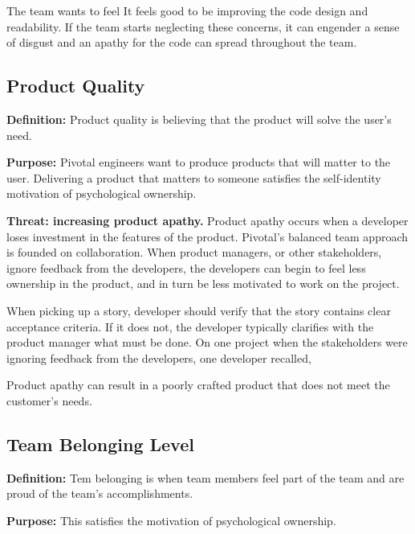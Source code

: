 The team wants to feel   It feels good to be improving the code design and readability. If the team starts neglecting these concerns, it can engender a sense of disgust and an apathy for the code can spread throughout the team.

\subsection{Product Quality}
\textbf{Definition:} Product quality is believing that the product will solve the user's need.

\textbf{Purpose:} Pivotal engineers want to produce products that will matter to the user. Delivering a product that matters to someone satisfies the self-identity motivation of psychological ownership.

\textbf{Threat: increasing product apathy.} Product apathy occurs when a developer loses investment in the features of the product. Pivotal's balanced team approach is founded on collaboration. When product managers, or other stakeholders, ignore feedback from the developers, the developers can begin to feel less ownership in the product, and in turn be less motivated to work on the project.

When picking up a story, developer should verify that the story contains clear acceptance criteria. If it does not, the developer typically clarifies with the product manager what must be done. On one project when the stakeholders were ignoring feedback from the developers, one developer recalled,  


Product apathy can result in a poorly crafted product that does not meet the customer's needs.

\subsection{Team Belonging Level}
\textbf{Definition:} Tem belonging is when team members feel part of the team and are proud of the team's accomplishments.

\textbf{Purpose:} This satisfies the  motivation of psychological ownership.

